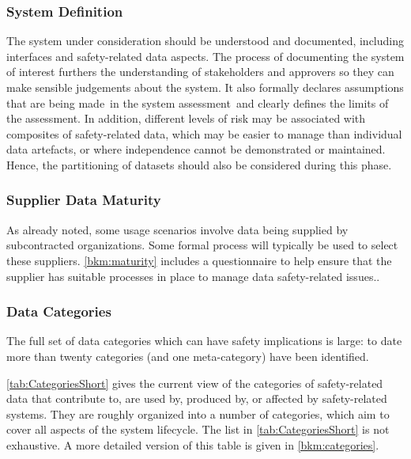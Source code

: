 \subsubsection{System Definition}
The system under consideration should be understood and documented, including interfaces and safety-related data aspects. The process of documenting the system of interest furthers the understanding of \glspl{stakeholder} and approvers so they can make sensible judgements about the system. It also formally declares assumptions that are being made\cbstart\ in the system assessment\cbend\ and clearly defines the limits of the assessment. In addition, different levels of risk may be associated with composites of safety-related data, which may be easier to manage than individual \cbstart\glspl{data artefact}\cbend, or where independence cannot be demonstrated or maintained. Hence, the partitioning of \glspl{dataset} should also be considered during this phase.

\subsubsection{Supplier Data Maturity}
As \cbstart already noted, some usage scenarios involve data being supplied by subcontracted organizations. Some formal process will typically be used to select these suppliers. \autoref{bkm:maturity} includes a questionnaire to help ensure that the supplier has suitable processes in place to manage data safety-related issues.\cbend.

\subsubsection{Data Categories}
\label{bkm:datacategories}
The full set of data categories which can have safety implications is large: to date more than twenty categories (and one meta-category) have been identified. 

\cbstart\autoref{tab:CategoriesShort} gives the current view of the categories of safety-related data that contribute to, are used by, produced by, or affected by safety-related systems. They are roughly organized into a number of categories, which aim to cover all aspects of the system lifecycle. The list in \autoref{tab:CategoriesShort} is not exhaustive. A more detailed version of this table is given in \autoref{bkm:categories}.\cbend\

